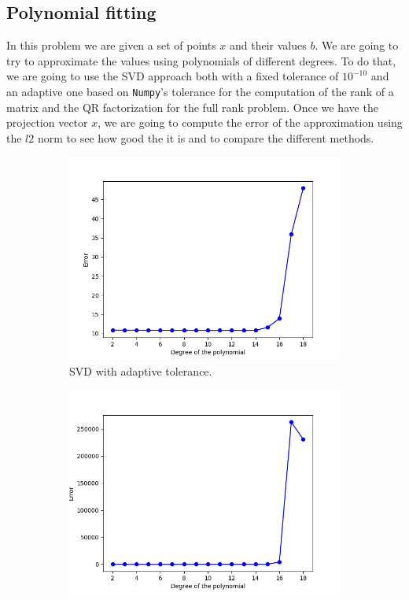 \documentclass[11pt,a4paper]{article}
\begin{document}
\subsection{Polynomial fitting}

In this problem we are given a set of points $x$ and their values $b$. We are going to try to
approximate the values using polynomials of different degrees. To do that, we are going to use
the SVD approach both with a fixed tolerance of $10^{-10}$ and an adaptive one based on \texttt{Numpy}'s
tolerance for the computation of the rank of a matrix and the QR factorization for the full rank problem.
Once we have the projection vector $x$, we are going to compute the error of the approximation using the
$l2$ norm to see how good the it is and to compare the different methods.

\begin{figure}[H]
  \centering
  \begin{subfigure}[t]{.5\textwidth}
    \centering
    \includegraphics[scale=0.4]{img/lsp_svd_adaptive_tol}
    \caption{SVD with adaptive tolerance.}
    \label{fig:lsp-svd-adaptive-tol}
  \end{subfigure}%
  \begin{subfigure}[t]{.5\textwidth}
    \centering
    \includegraphics[scale=0.4]{img/lsp_svd_fix_tol}

\end{subfigure}
\end{figure}
\end{document}

